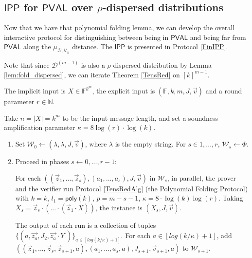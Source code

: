 \documentclass[11pt]{article}
\makeatletter
\newcommand{\poly}{\mathsf{poly}}
\newcommand{\PVAL}{\mathsf{PVAL}}
\newcommand{\IPP}{\mathsf{IPP}}
\newcommand{\sD}{\mathcal{D}}
\newenvironment{protocol}[1][htb]{
    \renewcommand{\ALG@name}{Protocol}
    \begin{algorithm}[#1]
    }{\end{algorithm}
}
\makeatother
\begin{document}
\subsection{$\IPP$ for $\PVAL$ over $\rho$-dispersed distributions}
\label{sec:IPP}

Now that we have that polynomial folding lemma, we can develop the overall interactive protocol for distinguishing between being in $\PVAL$ and being far from $\PVAL$ along the $\mu_{\mathcal{D},\mathcal{U}_{n}}$ distance. The $\IPP$ is presented in Protocol \ref{FinIPP}.

Note that since $\sD^{(m-1)}$ is also a $\rho$-dispersed distribution by Lemma \ref{lem:fold_dispersed}, we can iterate Theorem \ref{TensRed} on $[k]^{m-1}$.

\begin{protocol}
\caption{$\IPP$ for $\PVAL$ over $\rho$-dispersed distributions}
\label{FinIPP}
The implicit input is $X \in \mathbb{F}^{k^{m}}$, the explicit input is $(\mathbb{F}, k, m, J, \vec{v})$ and a round parameter $r \in \mathbb{N}$.

Take $n = \vert X\vert  = k^{m}$ to be the input message length, and set a soundness amplification parameter $\kappa = 8 \log (r) \cdot \log (k)$.

\begin{enumerate}
    \item Set $\mathcal{W}_{0} \longleftarrow {(\lambda, \lambda, J, \vec{v})}$, where $\lambda$ is the empty string. For $s \in {1, . . . , r}$, $\mathcal{W}_{s}\longleftarrow \Phi$.
    \item\label{FinIPPPFSteps} Proceed in phases $s \longleftarrow 0, . . . , r - 1$:

    For each $((\vec{z}_{1}, . . . , \vec{z}_{s}),(a_{1}, . . . , a_{s}), J, \vec{v})$ in $\mathcal{W}_{s}$, in parallel, the prover and the verifier run Protocol \ref{TensRedAlg} (the Polynomial Folding Protocol) with $k =k$, $l_{1}=\poly(k)$, $p=m-s-1$, $\kappa=8\cdot \log (k) \log (r)$. Taking $X_{s} = \vec{z}_{s}\cdot (. . . \cdot(\vec{z}_{1} \cdot X))$, the instance is $(X_{s}, J, \vec{v})$.

    The output of each run is a collection of tuples $\{(a, \vec{z_{a}}, J_{2}, \vec{z_{a}}\cdot  Y^\prime)\}_{a\in[log(k/\kappa)+1]}$. For each $a\in[log(k/\kappa)+1]$, add $((\vec{z}_{1}, . . . , \vec{z}_{s}, \vec{z}_{s+1},a),(a_{1}, . . . , a_{s}, a), J_{s+1}, \vec{v}_{s+1},a)$ to $\mathcal{W}_{s+1}$.


\end{enumerate}
\end{protocol}
\end{document}
